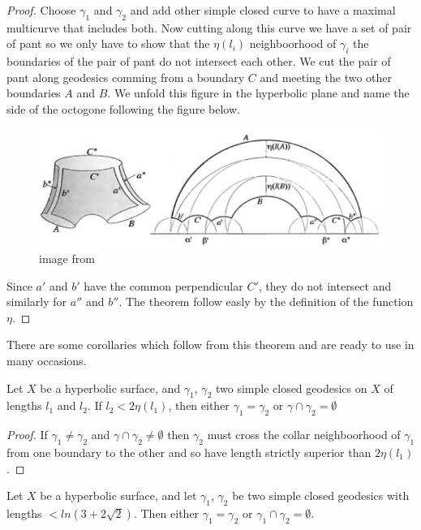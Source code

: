 \begin{proof}
Choose $\gamma_1$ and $\gamma_2$ and add other simple closed curve to have a maximal multicurve that includes both.
Now cutting along this curve we have a set of pair of pant so we only have to show that the $\eta(l_i)$ neighboorhood of $\gamma_i$ the boundaries of the pair of pant do not intersect each other. We cut the pair of pant along geodesics comming from a boundary $C$ and meeting the two other boundaries $A$ and $B$. We unfold this figure in the hyperbolic plane and name the side of the octogone following the figure below.

\begin{figure}[h!]
\centering
\includegraphics[width=12cm]{Image/CollarProof.jpg}
\caption{image from \cite{hubbard:hal-01297628}}
\end{figure}

Since $a'$ and $b'$ have the common perpendicular $C'$, they do not intersect and similarly for $a''$ and $b''$. The theorem follow easly by the definition of the function $\eta$.

\end{proof}

There are some corollaries which follow from this theorem and are ready to use in many occasions.

\begin{cor}
Let $X$ be a hyperbolic surface, and $\gamma_1$, $\gamma_2$ two simple closed geodesics on $X$ of lengths $l_1$ and $l_2$. If $l_2 < 2 \eta(l_1)$, then either $\gamma_1=\gamma_2$ or $\gamma \cap \gamma_2 = \emptyset$
\end{cor}

\begin{proof}
If $\gamma_1 \neq \gamma_2$ and $\gamma \cap \gamma_2 \neq \emptyset$ then $\gamma_2$ must cross the collar neighboorhood of $\gamma_1$ from one boundary to the other and so have length strictly superior than $2 \eta(l_1)$.
\end{proof}

\begin{cor}
Let $X$ be a hyperbolic surface, and let $\gamma_1$, $\gamma_2$ be two simple closed geodesics with lengths $< ln(3+2 \sqrt{2})$. Then either $\gamma_1=\gamma_2$ or $\gamma_1 \cap \gamma_2 = \emptyset$.
\end{cor}


